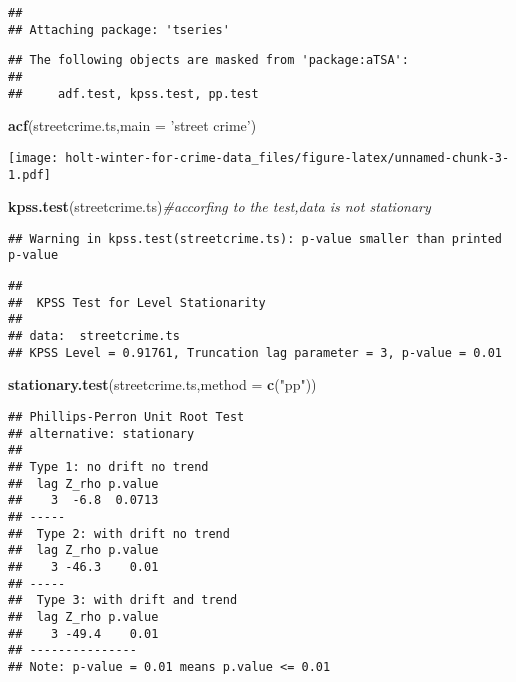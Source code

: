 \documentclass[]{article}
\newenvironment{Shaded}{\begin{snugshade}}{\end{snugshade}}
\newcommand{\CommentTok}[1]{\textcolor[rgb]{0.56,0.35,0.01}{\textit{#1}}}
\newcommand{\DataTypeTok}[1]{\textcolor[rgb]{0.13,0.29,0.53}{#1}}
\newcommand{\KeywordTok}[1]{\textcolor[rgb]{0.13,0.29,0.53}{\textbf{#1}}}
\newcommand{\NormalTok}[1]{#1}
\newcommand{\StringTok}[1]{\textcolor[rgb]{0.31,0.60,0.02}{#1}}
\begin{document}
\begin{verbatim}
## 
## Attaching package: 'tseries'
\end{verbatim}

\begin{verbatim}
## The following objects are masked from 'package:aTSA':
## 
##     adf.test, kpss.test, pp.test
\end{verbatim}

\begin{Shaded}
\begin{Highlighting}[]
\KeywordTok{acf}\NormalTok{(streetcrime.ts,}\DataTypeTok{main =} \StringTok{'street crime'}\NormalTok{)}
\end{Highlighting}
\end{Shaded}

\texttt{[image: holt-winter-for-crime-data\_files/figure-latex/unnamed-chunk-3-1.pdf]}

\begin{Shaded}
\begin{Highlighting}[]
\KeywordTok{kpss.test}\NormalTok{(streetcrime.ts)}\CommentTok{#accorfing to the test,data is not stationary}
\end{Highlighting}
\end{Shaded}

\begin{verbatim}
## Warning in kpss.test(streetcrime.ts): p-value smaller than printed p-value
\end{verbatim}

\begin{verbatim}
## 
##  KPSS Test for Level Stationarity
## 
## data:  streetcrime.ts
## KPSS Level = 0.91761, Truncation lag parameter = 3, p-value = 0.01
\end{verbatim}

\begin{Shaded}
\begin{Highlighting}[]
\KeywordTok{stationary.test}\NormalTok{(streetcrime.ts,}\DataTypeTok{method =} \KeywordTok{c}\NormalTok{(}\StringTok{"pp"}\NormalTok{))}
\end{Highlighting}
\end{Shaded}

\begin{verbatim}
## Phillips-Perron Unit Root Test 
## alternative: stationary 
##  
## Type 1: no drift no trend 
##  lag Z_rho p.value
##    3  -6.8  0.0713
## ----- 
##  Type 2: with drift no trend 
##  lag Z_rho p.value
##    3 -46.3    0.01
## ----- 
##  Type 3: with drift and trend 
##  lag Z_rho p.value
##    3 -49.4    0.01
## --------------- 
## Note: p-value = 0.01 means p.value <= 0.01
\end{verbatim}
\end{document}
